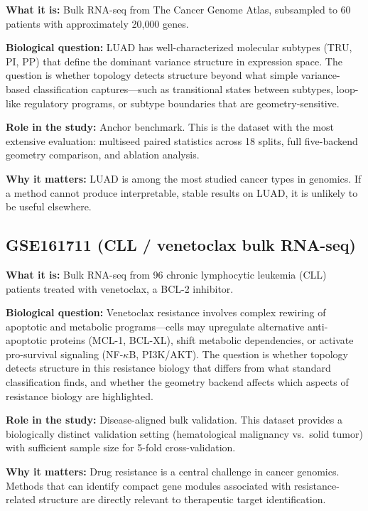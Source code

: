 \documentclass[11pt]{article}
\begin{document}
\textbf{What it is:} Bulk RNA-seq from The Cancer Genome Atlas, subsampled to 60 patients with approximately 20{,}000 genes.

\textbf{Biological question:} LUAD has well-characterized molecular subtypes (TRU, PI, PP) that define the dominant variance structure in expression space.
The question is whether topology detects structure beyond what simple variance-based classification captures---such as transitional states between subtypes, loop-like regulatory programs, or subtype boundaries that are geometry-sensitive.

\textbf{Role in the study:} Anchor benchmark.
This is the dataset with the most extensive evaluation: multiseed paired statistics across 18 splits, full five-backend geometry comparison, and ablation analysis.

\textbf{Why it matters:} LUAD is among the most studied cancer types in genomics.
If a method cannot produce interpretable, stable results on LUAD, it is unlikely to be useful elsewhere.

\subsection{GSE161711 (CLL / venetoclax bulk RNA-seq)}

\textbf{What it is:} Bulk RNA-seq from 96 chronic lymphocytic leukemia (CLL) patients treated with venetoclax, a BCL-2 inhibitor.

\textbf{Biological question:} Venetoclax resistance involves complex rewiring of apoptotic and metabolic programs---cells may upregulate alternative anti-apoptotic proteins (MCL-1, BCL-XL), shift metabolic dependencies, or activate pro-survival signaling (NF-$\kappa$B, PI3K/AKT).
The question is whether topology detects structure in this resistance biology that differs from what standard classification finds, and whether the geometry backend affects which aspects of resistance biology are highlighted.

\textbf{Role in the study:} Disease-aligned bulk validation.
This dataset provides a biologically distinct validation setting (hematological malignancy vs.\ solid tumor) with sufficient sample size for 5-fold cross-validation.

\textbf{Why it matters:} Drug resistance is a central challenge in cancer genomics.
Methods that can identify compact gene modules associated with resistance-related structure are directly relevant to therapeutic target identification.
\end{document}

